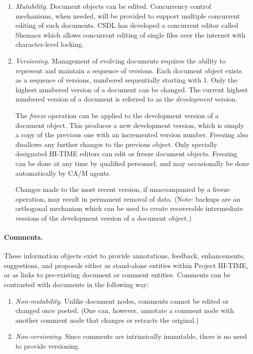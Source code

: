 \begin{enumerate}

\item {\em Mutability.\/} Document objects can be edited.  Concurrency
  control mechanisms, when needed, will be provided to support multiple
  concurrent editing of such documents. CSDL has developed a concurrent
  editor called Shemacs which allows concurrent editing of single files over
  the internet with character-level locking.

\item {\em Versioning.\/} Management of evolving documents requires the
  ability to represent and maintain a sequence of versions.  Each
  document object exists as a sequence of versions, numbered sequentially
  starting with 1.  Only the highest numbered version of a document can
  be changed.  The current highest numbered version of a document is
  referred to as the {\em development\/} version.

  The {\em freeze\/} operation can be applied to the development version
  of a document object.  This produces a new development version, which
  is simply a copy of the previous one with an incremented version
  number. Freezing also disallows any further changes to the previous
  object.  Only specially designated HI-TIME editors can edit or freeze
  document objects.  Freezing can be done at any time by qualified
  personnel, and may occasionally be done automatically by CA/M agents.

  Changes made to the most recent version, if unaccompanied by a freeze
  operation, may result in permanent removal of data. (Note: backups are
  an orthogonal mechanism which can be used to create recoverable
  intermediate versions of the development version of a document object.)

\end{enumerate}

\paragraph{Comments.}
These information objects exist to provide annotations, feedback,
enhancements, suggestions, and proposals either as stand-alone entities
within Project HI-TIME, or as links to pre-existing document or comment
entities. Comments can be contrasted with documents in the following
way:

\begin{enumerate}
\item {\em Non-mutability.\/}  Unlike document nodes, comments cannot be
edited or changed once posted. (One can, however, annotate a comment node
with another comment node that changes or retracts the original.)  

\item {\em Non-versioning.\/}  Since comments are intrinsically immutable,
there is no need to provide versioning. 
\end{enumerate}


